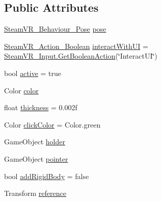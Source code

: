 \subsection*{Public Attributes}
\begin{DoxyCompactItemize}
\item 
\mbox{\hyperlink{class_valve_1_1_v_r_1_1_steam_v_r___behaviour___pose}{Steam\+V\+R\+\_\+\+Behaviour\+\_\+\+Pose}} \mbox{\hyperlink{class_valve_1_1_v_r_1_1_extras_1_1_steam_v_r___laser_pointer_ab909a8ae437363a55c393d24c1341b3d}{pose}}
\item 
\mbox{\hyperlink{class_valve_1_1_v_r_1_1_steam_v_r___action___boolean}{Steam\+V\+R\+\_\+\+Action\+\_\+\+Boolean}} \mbox{\hyperlink{class_valve_1_1_v_r_1_1_extras_1_1_steam_v_r___laser_pointer_aaa009efedba992f321cf96e7e04d467e}{interact\+With\+UI}} = \mbox{\hyperlink{class_valve_1_1_v_r_1_1_steam_v_r___input_a1442b5592282c75d7caeb91fe3509124}{Steam\+V\+R\+\_\+\+Input.\+Get\+Boolean\+Action}}(\char`\"{}Interact\+UI\char`\"{})
\item 
bool \mbox{\hyperlink{class_valve_1_1_v_r_1_1_extras_1_1_steam_v_r___laser_pointer_a77b72f76700e3991808c7647fc98332a}{active}} = true
\item 
Color \mbox{\hyperlink{class_valve_1_1_v_r_1_1_extras_1_1_steam_v_r___laser_pointer_a5e15f989223472d3027482e4ff349e57}{color}}
\item 
float \mbox{\hyperlink{class_valve_1_1_v_r_1_1_extras_1_1_steam_v_r___laser_pointer_ae39fdabafa506a2e637d7944c5f841a0}{thickness}} = 0.\+002f
\item 
Color \mbox{\hyperlink{class_valve_1_1_v_r_1_1_extras_1_1_steam_v_r___laser_pointer_a1b17d65eede2cc5a3e34ed2ff5306020}{click\+Color}} = Color.\+green
\item 
Game\+Object \mbox{\hyperlink{class_valve_1_1_v_r_1_1_extras_1_1_steam_v_r___laser_pointer_aa1cea1b55303b0b2f16e26c40b3bfda6}{holder}}
\item 
Game\+Object \mbox{\hyperlink{class_valve_1_1_v_r_1_1_extras_1_1_steam_v_r___laser_pointer_af3e7567e70ead825a1a0d21ade26585b}{pointer}}
\item 
bool \mbox{\hyperlink{class_valve_1_1_v_r_1_1_extras_1_1_steam_v_r___laser_pointer_a43e0a43b0ef9d0956f761234bf4b93b1}{add\+Rigid\+Body}} = false
\item 
Transform \mbox{\hyperlink{class_valve_1_1_v_r_1_1_extras_1_1_steam_v_r___laser_pointer_a23067c70d4bb3660722aab831cfa0286}{reference}}
\end{DoxyCompactItemize}
